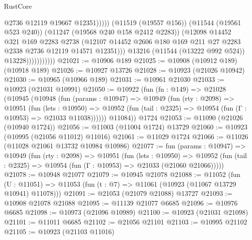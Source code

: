 \begin{lexlean}{RustCore}
\begin{coremodule}
                                      @2736
                                      @12119
                                      @19667
                                      @12351)))))
                            (@11519 (@19557 @156))
                            (@11544 (@19561 @523 @240))
                            (@11247 (@19568 @240 @158 @2412 @2283))
                            (@12098
                              @14452
                              @321
                              @169
                              @2283
                              @2738
                              (@12107
                                @14452
                                @2606
                                @180
                                @169
                                @211
                                @27
                                @2283
                                @2338
                                @2736
                                @12119
                                @14571
                                @12351)))
                          @13216
                          (@11544 (@13222 @992 @524))
                          @13228)))))))))))
@21021 := @10906 @189
@21025 := @10908 (@10912 @189) (@10918 @189)
@21026 := @10927 @13726
@21028 := @10923 (@21026 @10942)
@21030 := @10965 (@10966 @189)
@21031 := @10961 @21030
@21033 := @10923 (@21031 @10991)
@21050 := @10922
    (fun (fn : @149) =>
    @21028
      (@10945
        (@10948
          (fun (params : @10947) =>
          @10949
            (fun (rty : @2098) =>
            @10951
              (fun (lets : @10950) =>
              @10952 (fun (tail : @2325) => @10954 (fun (Γ : @10953) => @21033 @11038))))))
        @11084))
    @1724
@21053 := @11090 (@21026 (@10940 @1724))
@21056 := @11003 (@11004 @1724) @13729
@21060 := @10923 (@10995 (@21056 @11012) @11016)
@21061 := @11029 @1724
@21066 := @11026 (@11028 @21061 @13732 @10984 @10986)
@21077 := fun (params : @10947) =>
  @10949
    (fun (rty : @2098) =>
    @10951
      (fun (lets : @10950) =>
      @10952 (fun (tail : @2325) => @10954 (fun (Γ : @10953) => @21033 (@21060 @21066)))))
@21078 := @10948 @21077
@21079 := @10945 @21078
@21088 := @11052
    (fun (U : @11051) => @11053 (fun (t : @7) => @11061 (@10923 (@11067 @13729 @10941) @11078)))
@21091 := @21053 (@21079 @21088) @13727
@21093 := @10908 @21078 @21088
@21095 := @11139 @21077 @6685
@21096 := @10976 @6685
@21098 := @10973 (@21096 @10989)
@21100 := @10923 (@21031 @21098)
@21101 := @11011 @6685
@21102 := @21056 @21101
@21103 := @10995 @21102
@21105 := @10923 (@21103 @11016)

\end{coremodule}
\end{lexlean}
